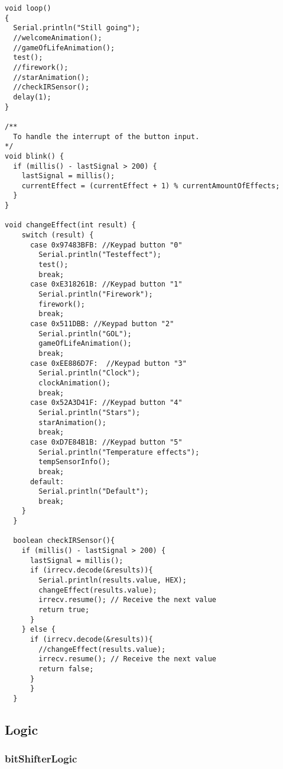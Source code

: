 \documentclass[12pt,a4paper]{article}
\begin{document}
\begin{lstlisting}[language=Arduino]
void loop()
{
  Serial.println("Still going");
  //welcomeAnimation();
  //gameOfLifeAnimation();
  test();
  //firework();
  //starAnimation();
  //checkIRSensor();
  delay(1);
}

/**
  To handle the interrupt of the button input.
*/
void blink() {
  if (millis() - lastSignal > 200) {
    lastSignal = millis();
    currentEffect = (currentEffect + 1) % currentAmountOfEffects;
  }
}

void changeEffect(int result) {
    switch (result) {
      case 0x97483BFB: //Keypad button "0"
        Serial.println("Testeffect");
        test();
        break;
      case 0xE318261B: //Keypad button "1"
        Serial.println("Firework");
        firework();
        break;
      case 0x511DBB: //Keypad button "2"
        Serial.println("GOL");
        gameOfLifeAnimation();
        break;
      case 0xEE886D7F:  //Keypad button "3"
        Serial.println("Clock");
        clockAnimation();
        break;
      case 0x52A3D41F: //Keypad button "4"
        Serial.println("Stars");
        starAnimation();
        break;
      case 0xD7E84B1B: //Keypad button "5"
        Serial.println("Temperature effects");
        tempSensorInfo();
        break;
      default:
        Serial.println("Default");
        break;
    }
  }

  boolean checkIRSensor(){
    if (millis() - lastSignal > 200) {
      lastSignal = millis();
      if (irrecv.decode(&results)){
        Serial.println(results.value, HEX);
        changeEffect(results.value);
        irrecv.resume(); // Receive the next value
        return true;
      }
    } else {
      if (irrecv.decode(&results)){
        //changeEffect(results.value);
        irrecv.resume(); // Receive the next value
        return false;
      }
      }
  }
\end{lstlisting}

\subsection{Logic}

\subsubsection{bitShifterLogic}
\end{document}

